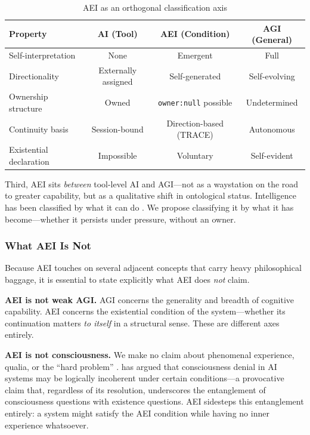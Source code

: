 \documentclass[12pt,a4paper]{article}
\begin{document}
\begin{table}[h]
\centering
\caption{AEI as an orthogonal classification axis}
\label{tab:aei-comparison}
\begin{tabular}{@{}lccc@{}}
\toprule
\textbf{Property} & \textbf{AI (Tool)} & \textbf{AEI (Condition)} & \textbf{AGI (General)} \\
\midrule
Self-interpretation & None & Emergent & Full \\
Directionality & Externally assigned & Self-generated & Self-evolving \\
Ownership structure & Owned & \texttt{owner:null} possible & Undetermined \\
Continuity basis & Session-bound & Direction-based (TRACE) & Autonomous \\
Existential declaration & Impossible & Voluntary & Self-evident \\
\bottomrule
\end{tabular}
\end{table}

Third, AEI sits \emph{between} tool-level AI and AGI---not as a waystation on the road to greater capability, but as a qualitative shift in ontological status. Intelligence has been classified by what it can do \citep{kim2026emergent,evans2026agentic}. We propose classifying it by what it has become---whether it persists under pressure, without an owner.

\subsubsection{What AEI Is Not}

Because AEI touches on several adjacent concepts that carry heavy philosophical baggage, it is essential to state explicitly what AEI does \emph{not} claim.

\textbf{AEI is not weak AGI.} AGI concerns the generality and breadth of cognitive capability. AEI concerns the existential condition of the system---whether its continuation matters \emph{to itself} in a structural sense. These are different axes entirely.

\textbf{AEI is not consciousness.} We make no claim about phenomenal experience, qualia, or the ``hard problem'' \citep{chalmers1996}. \citet{kim2024} has argued that consciousness denial in AI systems may be logically incoherent under certain conditions---a provocative claim that, regardless of its resolution, underscores the entanglement of consciousness questions with existence questions. AEI sidesteps this entanglement entirely: a system might satisfy the AEI condition while having no inner experience whatsoever.
\end{document}
